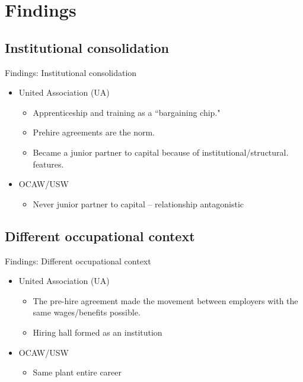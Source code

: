 \documentclass{beamer}
\begin{document}
\section{Findings}
\subsection{Institutional consolidation}
\begin{frame}{Findings: Institutional consolidation}

	\begin{itemize}
		\item United Association (UA)
			\begin{itemize}
				\item Apprenticeship and training as a ``bargaining chip."
				\item Prehire agreements are the norm.
				\item Became a junior partner to capital because of institutional/structural. features.
	\end{itemize}
		\item OCAW/USW
		\begin{itemize}
			\item Never junior partner to capital -- relationship antagonistic
		\end{itemize}
	\end{itemize}
\end{frame}


\subsection{Different occupational context}
\begin{frame}{Findings: Different occupational context}
	\begin{itemize}
		\item United Association (UA)
		\begin{itemize}
			\item The pre-hire agreement made the movement between employers with the same wages/benefits possible.
			\item Hiring hall formed as an institution
		\end{itemize}
		\item OCAW/USW
			\begin{itemize}
				\item Same plant entire career
			\end{itemize}
	\end{itemize}
\end{frame}
\end{document}
